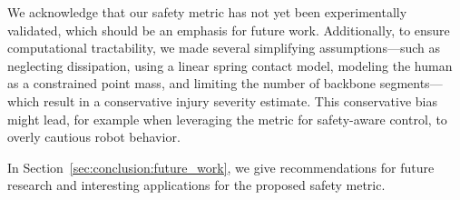 We acknowledge that our safety metric has not yet been experimentally validated, which should be an emphasis for future work. Additionally, to ensure computational tractability, we made several simplifying assumptions—such as neglecting dissipation, using a linear spring contact model, modeling the human as a constrained point mass, and limiting the number of backbone segments—which result in a conservative injury severity estimate. This conservative bias might lead, for example when leveraging the metric for safety-aware control, to overly cautious robot behavior. %

In Section~\ref{sec:conclusion:future_work}, we give recommendations for future research and interesting applications for the proposed safety metric.

